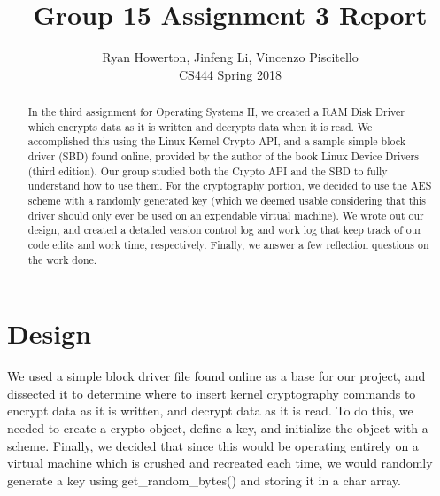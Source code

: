 \documentclass[10pt,draftclsnofoot,onecolumn]{IEEEtran}
\begin{document}
  \title{Group 15 Assignment 3 Report \vspace{\baselineskip}}
  \author{Ryan Howerton, Jinfeng Li, Vincenzo Piscitello \\
          CS444 Spring 2018 \vspace{10\baselineskip}}
  \maketitle
  \begin{abstract}
  	In the third assignment for Operating Systems II, we created a RAM Disk Driver which encrypts data as it is written and decrypts data when it is read. We accomplished this using the Linux Kernel Crypto API, and a sample simple block driver (SBD) found online, provided by the author of the book Linux Device Drivers (third edition). Our group studied both the Crypto API and the SBD to fully understand how to use them. For the cryptography portion, we decided to use the AES scheme with a randomly generated key (which we deemed usable considering that this driver should only ever be used on an expendable virtual machine). We wrote out our design, and created a detailed version control log and work log that keep track of our code edits and work time, respectively. Finally, we answer a few reflection questions on the work done.
  \end{abstract}
  \newpage
	\section{Design}
    We used a simple block driver file found online as a base for our project, and dissected it to determine where to insert kernel cryptography commands to encrypt data as it is written, and decrypt data as it is read. To do this, we needed to create a crypto object, define a key, and initialize the object with a scheme. Finally, we decided that since this would be operating entirely on a virtual machine which is crushed and recreated each time, we would randomly generate a key using get\_random\_bytes() and storing it in a char array.
\end{document}
